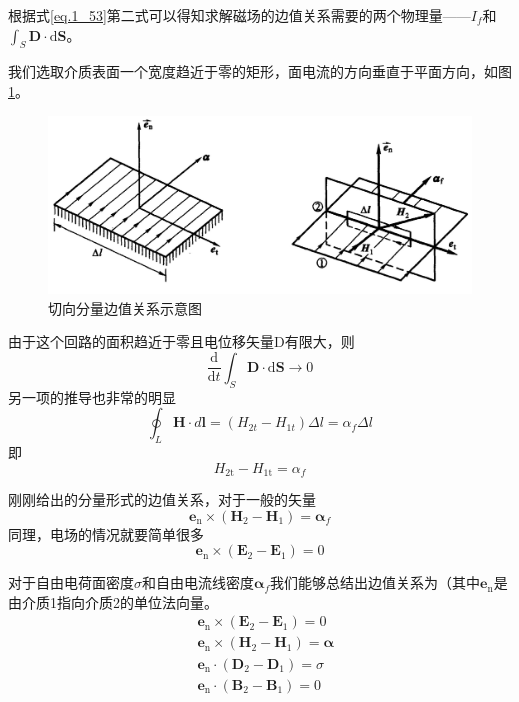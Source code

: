 			根据式\ref{eq.1_53}第二式可以得知求解磁场的边值关系需要的两个物理量——$I_f$和$ \int_{S} \boldsymbol{D} \cdot \mathrm{d} \boldsymbol{S}$。

			我们选取介质表面一个宽度趋近于零的矩形，面电流的方向垂直于平面方向，如图\ref{fig.切向分量边值关系示意图}。
			\begin{figure}[H]
				\centering  %
				\includegraphics[width=0.7\linewidth]{figs/切向分量边值关系示意图.jpg}
				\caption{切向分量边值关系示意图} %
				\label{fig.切向分量边值关系示意图}
				\end{figure}
			由于这个回路的面积趋近于零且电位移矢量D有限大，则
			\begin{equation}
			\frac{\mathrm{d}}{\mathrm{d} t} \int_{S} \boldsymbol{D} \cdot \mathrm{d} \boldsymbol{S} \to 0
			\end{equation}
			另一项的推导也非常的明显
			\begin{equation}
				\oint_L \boldsymbol{H} \cdot d \boldsymbol{l} = (H_{2t}-H_{1t}) \Delta l = \alpha_f \Delta l
			\end{equation}
			即
			\begin{equation}
				H_{2 \mathrm{t}}-H_{1 \mathrm{t}}=\alpha_{f}
			\end{equation}

			刚刚给出的分量形式的边值关系，对于一般的矢量
			\begin{equation}
				\boxed{\boldsymbol{e}_{\mathrm{n}} \times\left(\boldsymbol{H}_{2}-\boldsymbol{H}_{1}\right)=\boldsymbol{\alpha}_{f}}
			\end{equation}
			同理，电场的情况就要简单很多
			\begin{equation}
				\boxed{\boldsymbol{e}_{\mathrm{n}} \times (\boldsymbol{E}_2 - \boldsymbol{E}_1) = 0}
			\end{equation}
			
			\vspace*{3em}
			对于自由电荷面密度$\sigma$和自由电流线密度${\boldsymbol{\alpha}_f}$我们能够总结出边值关系为（其中$\boldsymbol{e}_{\mathrm{n}}$是由介质1指向介质2的单位法向量。
			\begin{equation}
				\begin{aligned}
				&\boldsymbol{e}_{\mathrm{n}} \times\left(\boldsymbol{E}_{2}-\boldsymbol{E}_{1}\right)=0 \\
				&\boldsymbol{e}_{\mathrm{n}} \times\left(\boldsymbol{H}_{2}-\boldsymbol{H}_{1}\right)=\boldsymbol{\alpha} \\
				&\boldsymbol{e}_{\mathrm{n}} \cdot\left(\boldsymbol{D}_{2}-\boldsymbol{D}_{1}\right)=\sigma \\
				&\boldsymbol{e}_{\mathrm{n}} \cdot\left(\boldsymbol{B}_{2}-\boldsymbol{B}_{1}\right)=0
				\end{aligned}
				\end{equation}

